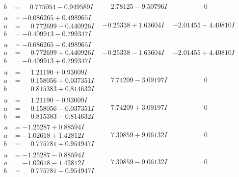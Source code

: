 \documentclass[1p]{elsarticle_modified}
\theoremstyle{definition}
\begin{document}
$$\begin{array}{c|c|c}
\begin{aligned}
b &= \phantom{-}0.775054 - 0.949589 I\end{aligned}
 & \phantom{-}2.78125 - 9.50796 I & \phantom{-0.000000 } 0 \\ \hline\begin{aligned}
u &= -0.086265 + 0.498965 I \\
a &= \phantom{-}0.772699 - 0.440926 I \\
b &= -0.409913 - 0.799347 I\end{aligned}
 & -0.25338 + 1.63604 I & -2.01455 - 4.40810 I \\ \hline\begin{aligned}
u &= -0.086265 - 0.498965 I \\
a &= \phantom{-}0.772699 + 0.440926 I \\
b &= -0.409913 + 0.799347 I\end{aligned}
 & -0.25338 - 1.63604 I & -2.01455 + 4.40810 I \\ \hline\begin{aligned}
u &= \phantom{-}1.21190 + 0.93009 I \\
a &= \phantom{-}0.158056 + 0.037351 I \\
b &= \phantom{-}0.815383 + 0.814632 I\end{aligned}
 & \phantom{-}7.74209 - 3.09197 I & \phantom{-0.000000 } 0 \\ \hline\begin{aligned}
u &= \phantom{-}1.21190 - 0.93009 I \\
a &= \phantom{-}0.158056 - 0.037351 I \\
b &= \phantom{-}0.815383 - 0.814632 I\end{aligned}
 & \phantom{-}7.74209 + 3.09197 I & \phantom{-0.000000 } 0 \\ \hline\begin{aligned}
u &= -1.25287 + 0.88594 I \\
a &= -1.02618 + 1.42812 I \\
b &= \phantom{-}0.775781 + 0.954947 I\end{aligned}
 & \phantom{-}7.30859 + 9.06132 I & \phantom{-0.000000 } 0 \\ \hline\begin{aligned}
u &= -1.25287 - 0.88594 I \\
a &= -1.02618 - 1.42812 I \\
b &= \phantom{-}0.775781 - 0.954947 I\end{aligned}
 & \phantom{-}7.30859 - 9.06132 I & \phantom{-0.000000 } 0 \\ \hline\begin{aligned}

\end{aligned}
\end{array}$$
\end{document}
